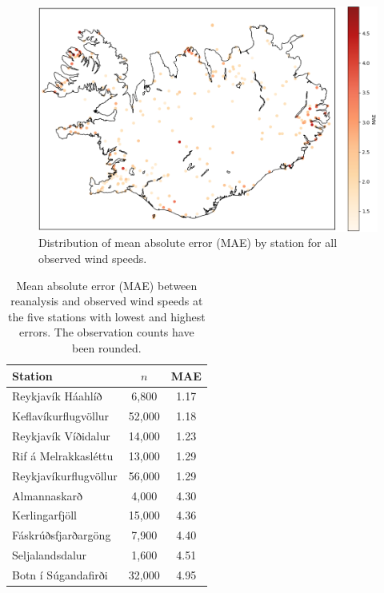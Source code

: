 \begin{figure}[h]
  \centering
  \includegraphics[scale=0.6]{Figures/MAEoverIceland.png}
  \caption[MAE distribution by station]{Distribution of mean absolute error (MAE) by station for all observed wind speeds.}
  \label{fig:station_mae_distribution}
\end{figure}

\begin{table}[h]
  \centering
  \caption[Station MAE extremes]{Mean absolute error (MAE) between reanalysis and observed wind speeds at the five stations with lowest and highest errors. The observation counts have been rounded.}
  \label{table:station_mae_distribution}
  \begin{tabular}{lcc}
    \toprule
    Station               & $n$     & MAE  \\
    \midrule
    Reykjavík Háahlíð     & 6,800   & 1.17 \\
    Keflavíkurflugvöllur  & 52,000  & 1.18 \\
    Reykjavík Víðidalur   & 14,000  & 1.23 \\
    Rif á Melrakkasléttu  & 13,000  & 1.29 \\
    Reykjavíkurflugvöllur & 56,000  & 1.29 \\
    \midrule
    Almannaskarð          &  4,000  & 4.30 \\
    Kerlingarfjöll        & 15,000  & 4.36 \\
    Fáskrúðsfjarðargöng   &  7,900  & 4.40 \\
    Seljalandsdalur       &  1,600  & 4.51 \\
    Botn í Súgandafirði   & 32,000  & 4.95 \\
    \bottomrule
  \end{tabular}
\end{table}

